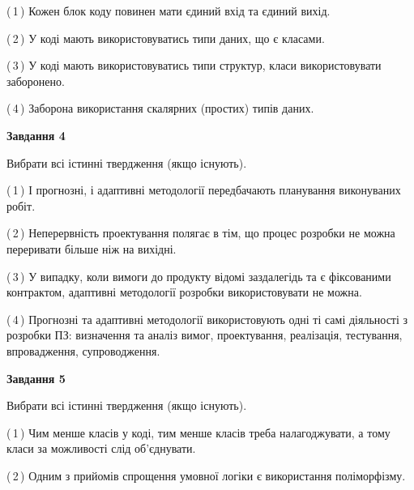 \documentclass[10pt, ukrainian]{article}
\begin{document}
{\begin {large}
(\,1\,) Кожен блок коду повинен мати єдиний вхід та єдиний вихід.%



(\,2\,) У коді мають використовуватись типи даних, що є класами. %



(\,3\,) У коді мають використовуватись типи структур, класи використовувати заборонено. %



(\,4\,) Заборона використання скалярних (простих) типів даних. %


{\begin {center}\textbf{Завдання 4}\end {center}}\par
Вибрати всі істинні твердження (якщо існують).\par
\vspace{2mm}



(\,1\,) І прогнозні, і адаптивні методології передбачають планування виконуваних робіт. %



(\,2\,) Неперервність проектування полягає в тім, що процес розробки не можна переривати більше ніж на вихідні. %



(\,3\,) У випадку, коли вимоги до продукту відомі заздалегідь та є фіксованими контрактом, адаптивні методології розробки використовувати не можна. %



(\,4\,) Прогнозні та адаптивні методології використовують одні ті самі діяльності з розробки ПЗ: визначення та аналіз вимог, проектування, реалізація, тестування, впровадження, супроводження. %


{\begin {center}\textbf{Завдання 5}\end {center}}\par
Вибрати всі істинні твердження (якщо існують).\par
\vspace{2mm}



(\,1\,) Чим менше класів у коді, тим менше класів треба налагоджувати, а тому класи за можливості слід об'єднувати. %



(\,2\,) Одним з прийомів спрощення умовної логіки є використання поліморфізму. %




\end{large}}
\end{document}
